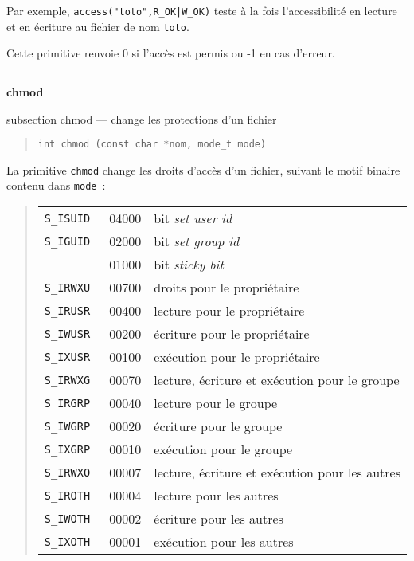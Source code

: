 \documentclass [twoside] {report}
\newcommand {\primitive} [1]
    {
	{\large \bf #1}
	\addcontentsline {toc} {subsection} {#1}
    }
\newcommand {\separation}
    {
	\vspace {7mm}
	\nopagebreak
	\hrule
    }
\begin{document}
Par exemple, \verb/access("toto",R_OK|W_OK)/ teste à la fois
l'accessibilité en lecture et en écriture au fichier de nom {\tt toto}.

Cette primitive renvoie 0 si l'accès est permis
ou -1 en cas d'erreur.




\separation
\primitive {chmod} --- change les protections d'un fichier

\begin {quote}
\begin {verbatim}
int chmod (const char *nom, mode_t mode)
\end{verbatim}
\end {quote}

La primitive {\tt chmod} change les droits d'accès
d'un fichier, suivant le motif binaire contenu
dans {\tt mode}~:

\begin {quote}
    \begin {tabular} {|lll|} \hline
	\tt S\_ISUID & 04000 & bit {\it set user id} \\
	\tt S\_IGUID & 02000 & bit {\it set group id} \\
	             & 01000 & bit {\it sticky bit} \\
	\tt S\_IRWXU & 00700 & droits pour le propriétaire \\
	\tt S\_IRUSR & 00400 & lecture pour le propriétaire \\
	\tt S\_IWUSR & 00200 & écriture pour le propriétaire \\
	\tt S\_IXUSR & 00100 & exécution pour le propriétaire \\
	\tt S\_IRWXG & 00070 & lecture, écriture et exécution pour le groupe \\
	\tt S\_IRGRP & 00040 & lecture pour le groupe \\
	\tt S\_IWGRP & 00020 & écriture pour le groupe \\
	\tt S\_IXGRP & 00010 & exécution pour le groupe \\
	\tt S\_IRWXO & 00007 & lecture, écriture et exécution pour les autres \\
	\tt S\_IROTH & 00004 & lecture pour les autres \\
	\tt S\_IWOTH & 00002 & écriture pour les autres \\
	\tt S\_IXOTH & 00001 & exécution pour les autres \\ \hline
    \end {tabular}
\end {quote}
\end{document}
